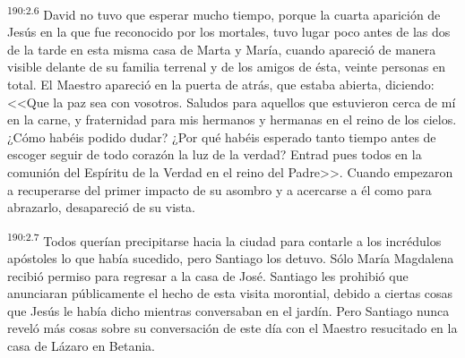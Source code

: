 \par 
\textsuperscript{190:2.6} David no tuvo que esperar mucho tiempo, porque la cuarta aparición de Jesús en la que fue reconocido por los mortales, tuvo lugar poco antes de las dos de la tarde en esta misma casa de Marta y María, cuando apareció de manera visible delante de su familia terrenal y de los amigos de ésta, veinte personas en total. El Maestro apareció en la puerta de atrás, que estaba abierta, diciendo: <<Que la paz sea con vosotros. Saludos para aquellos que estuvieron cerca de mí en la carne, y fraternidad para mis hermanos y hermanas en el reino de los cielos. ¿Cómo habéis podido dudar? ¿Por qué habéis esperado tanto tiempo antes de escoger seguir de todo corazón la luz de la verdad? Entrad pues todos en la comunión del Espíritu de la Verdad en el reino del Padre>>. Cuando empezaron a recuperarse del primer impacto de su asombro y a acercarse a él como para abrazarlo, desapareció de su vista.

\par 
\textsuperscript{190:2.7} Todos querían precipitarse hacia la ciudad para contarle a los incrédulos apóstoles lo que había sucedido, pero Santiago los detuvo. Sólo María Magdalena recibió permiso para regresar a la casa de José. Santiago les prohibió que anunciaran públicamente el hecho de esta visita morontial, debido a ciertas cosas que Jesús le había dicho mientras conversaban en el jardín. Pero Santiago nunca reveló más cosas sobre su conversación de este día con el Maestro resucitado en la casa de Lázaro en Betania.

